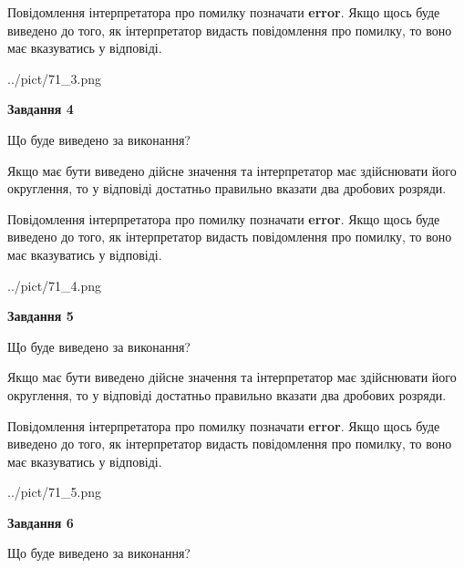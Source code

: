 \documentclass[12pt, ukrainian]{article}
\begin{document}
{\begin {Large}
Повідомлення інтерпретатора про помилку позначати \textbf{error}.
Якщо щось буде виведено до того, як інтерпретатор видасть повідомлення про помилку, 
то воно має вказуватись у відповіді. \par

\begin{center}
	{../pict/71_3.png}
\end{center}
\newpage

{\begin {center}\textbf{Завдання 4}\end {center}}\par
Що буде виведено за виконання? \par

Якщо має бути виведено дійсне значення та інтерпретатор має здійснювати його округлення, 
то у відповіді достатньо правильно вказати два дробових розряди.

Повідомлення інтерпретатора про помилку позначати \textbf{error}.
Якщо щось буде виведено до того, як інтерпретатор видасть повідомлення про помилку, 
то воно має вказуватись у відповіді. \par

\begin{center}
	{../pict/71_4.png}
\end{center}
\newpage

{\begin {center}\textbf{Завдання 5}\end {center}}\par
Що буде виведено за виконання? \par

Якщо має бути виведено дійсне значення та інтерпретатор має здійснювати його округлення, 
то у відповіді достатньо правильно вказати два дробових розряди.

Повідомлення інтерпретатора про помилку позначати \textbf{error}.
Якщо щось буде виведено до того, як інтерпретатор видасть повідомлення про помилку, 
то воно має вказуватись у відповіді. \par

\begin{center}
	{../pict/71_5.png}
\end{center}
\newpage

{\begin {center}\textbf{Завдання 6}\end {center}}\par
Що буде виведено за виконання? \par


\end{Large}}
\end{document}
